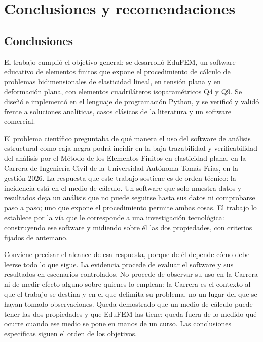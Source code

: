 \chapter*{Conclusiones y recomendaciones}

\section*{Conclusiones}

El trabajo cumplió el objetivo general: se desarrolló EduFEM, un software educativo de elementos finitos que expone el procedimiento de cálculo de problemas bidimensionales de elasticidad lineal, en tensión plana y en deformación plana, con elementos cuadriláteros isoparamétricos Q4 y Q9. Se diseñó e implementó en el lenguaje de programación Python, y se verificó y validó frente a soluciones analíticas, casos clásicos de la literatura y un software comercial.

El problema científico preguntaba de qué manera el uso del software de análisis estructural como caja negra podrá incidir en la baja trazabilidad y verificabilidad del análisis por el Método de los Elementos Finitos en elasticidad plana, en la Carrera de Ingeniería Civil de la Universidad Autónoma Tomás Frías, en la gestión 2026. La respuesta que este trabajo sostiene es de orden técnico: la incidencia está en el medio de cálculo. Un software que solo muestra datos y resultados deja un análisis que no puede seguirse hasta sus datos ni comprobarse paso a paso; uno que expone el procedimiento permite ambas cosas. El trabajo lo establece por la vía que le corresponde a una investigación tecnológica: construyendo ese software y midiendo sobre él las dos propiedades, con criterios fijados de antemano.

Conviene precisar el alcance de esa respuesta, porque de él depende cómo debe leerse todo lo que sigue. La evidencia procede de evaluar el software y sus resultados en escenarios controlados. No procede de observar su uso en la Carrera ni de medir efecto alguno sobre quienes lo emplean: la Carrera es el contexto al que el trabajo se destina y en el que delimita su problema, no un lugar del que se hayan tomado observaciones. Queda demostrado que un medio de cálculo puede tener las dos propiedades y que EduFEM las tiene; queda fuera de lo medido qué ocurre cuando ese medio se pone en manos de un curso. Las conclusiones específicas siguen el orden de los objetivos.

